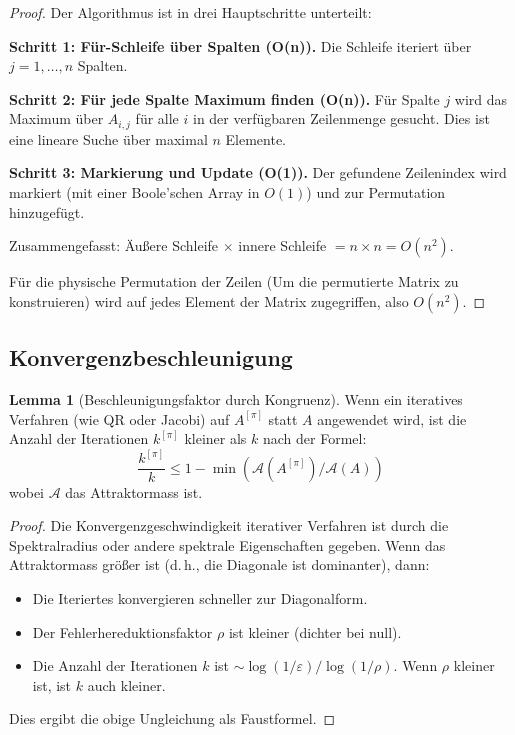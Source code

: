 \documentclass[a4paper,12pt]{article}
\theoremstyle{definition}
\newtheorem{lemma}{Lemma}
\begin{document}
\begin{proof}
	Der Algorithmus ist in drei Hauptschritte unterteilt:
	
	\textbf{Schritt 1: Für-Schleife über Spalten (O(n)).}
	Die Schleife iteriert über $j = 1, \ldots, n$ Spalten.
	
	\textbf{Schritt 2: Für jede Spalte Maximum finden (O(n)).}
	Für Spalte $j$ wird das Maximum über $A_{i,j}$ für alle $i$ in der verfügbaren Zeilenmenge gesucht. Dies ist eine lineare Suche über maximal $n$ Elemente.
	
	\textbf{Schritt 3: Markierung und Update (O(1)).}
	Der gefundene Zeilenindex wird markiert (mit einer Boole'schen Array in $O(1)$) und zur Permutation hinzugefügt.
	
	Zusammengefasst: Äußere Schleife $\times$ innere Schleife $= n \times n = O(n^2)$.
	
	Für die physische Permutation der Zeilen (Um die permutierte Matrix zu konstruieren) wird auf jedes Element der Matrix zugegriffen, also $O(n^2)$.
\end{proof}

\subsection{Konvergenzbeschleunigung}

\begin{lemma}[Beschleunigungsfaktor durch Kongruenz]
	\label{lem:beschleunigung}
	Wenn ein iteratives Verfahren (wie QR oder Jacobi) auf $A^{[\pi]}$ statt $A$ angewendet wird, ist die Anzahl der Iterationen $k^{[\pi]}$ kleiner als $k$ nach der Formel:
	\[
	\frac{k^{[\pi]}}{k} \leq 1 - \min(\mathcal{A}(A^{[\pi]}) / \mathcal{A}(A))
	\]
	wobei $\mathcal{A}$ das Attraktormass ist.
\end{lemma}

\begin{proof}
	Die Konvergenzgeschwindigkeit iterativer Verfahren ist durch die Spektralradius oder andere spektrale Eigenschaften gegeben. Wenn das Attraktormass größer ist (d.\,h., die Diagonale ist dominanter), dann:
	
	\begin{itemize}
		\item Die Iteriertes konvergieren schneller zur Diagonalform.
		\item Der Fehlerhereduktionsfaktor $\rho$ ist kleiner (dichter bei null).
		\item Die Anzahl der Iterationen $k$ ist $\sim \log(1/\varepsilon) / \log(1/\rho)$. Wenn $\rho$ kleiner ist, ist $k$ auch kleiner.
	\end{itemize}
	
	Dies ergibt die obige Ungleichung als Faustformel.
\end{proof}
\end{document}
